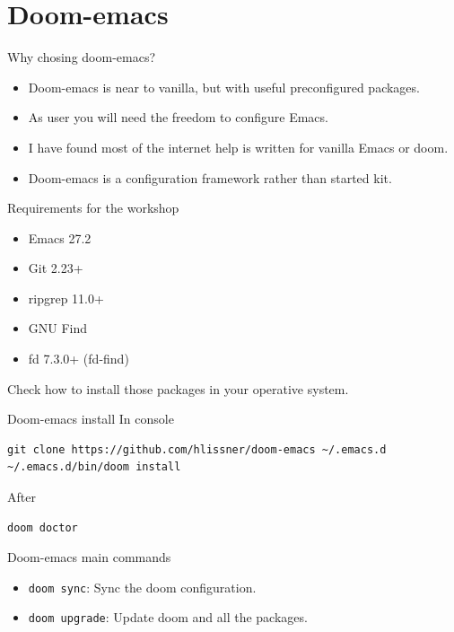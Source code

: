 \documentclass[presentation]{beamer}
\begin{document}
\section{Doom-emacs}
\label{sec:orgdcc6b6a}
\begin{frame}[label={sec:orga81813b}]{Why chosing doom-emacs?}
\begin{itemize}
\item Doom-emacs is near to vanilla, but with useful preconfigured packages.
\item As user you will need the freedom to configure Emacs.
\item I have found most of the internet help is written for vanilla Emacs or doom.
\item Doom-emacs is a configuration framework rather than started kit.
\end{itemize}
\end{frame}

\begin{frame}[label={sec:orgcb1a286}]{Requirements for the workshop}
\begin{itemize}
\item Emacs 27.2
\item Git 2.23+
\item ripgrep 11.0+
\item GNU Find
\item fd 7.3.0+ (fd-find)
\end{itemize}

Check how to install those packages in your operative system.
\end{frame}

\begin{frame}[label={sec:orge847348},fragile]{Doom-emacs install}
 In console

\begin{verbatim}
git clone https://github.com/hlissner/doom-emacs ~/.emacs.d
~/.emacs.d/bin/doom install
\end{verbatim}

After

\begin{verbatim}
doom doctor
\end{verbatim}
\end{frame}
\begin{frame}[label={sec:orga4af7b0},fragile]{Doom-emacs main commands}
 \begin{itemize}
\item \texttt{doom sync}: Sync the doom configuration.
\item \texttt{doom upgrade}: Update doom and all the packages.
\end{itemize}
\end{frame}
\end{document}
